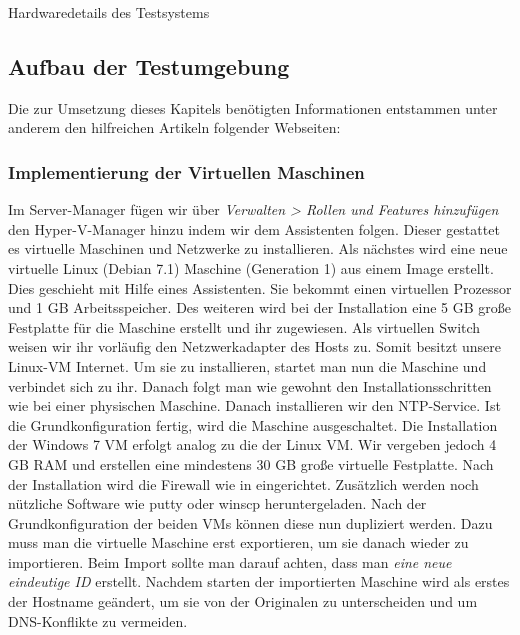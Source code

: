 \begin{table}
    \caption{Hardwaredetails des Testsystems}
    \label{tab:tabletestsystem}
\end{table}

\subsection{Aufbau der Testumgebung}
\label{app:testaufbau}
Die zur Umsetzung dieses Kapitels benötigten Informationen entstammen unter anderem den hilfreichen Artikeln folgender Webseiten: \cite{networkdriverhacking}

\subsubsection{Implementierung der Virtuellen Maschinen}
Im Server-Manager fügen wir über \textit{Verwalten > Rollen und Features hinzufügen} den Hyper-V-Manager hinzu indem wir dem Assistenten folgen. Dieser gestattet es virtuelle Maschinen und Netzwerke zu installieren.
Als nächstes wird eine neue virtuelle Linux (Debian 7.1)  Maschine (Generation 1) aus einem Image erstellt. Dies geschieht mit Hilfe eines Assistenten. Sie bekommt einen virtuellen Prozessor und 1 \ac{GB} Arbeitsspeicher. Des weiteren wird bei der Installation eine 5 \ac{GB} große Festplatte für die Maschine erstellt und ihr zugewiesen. Als virtuellen Switch weisen wir ihr vorläufig den Netzwerkadapter des Hosts zu. Somit besitzt unsere Linux-\ac{VM} Internet. Um sie zu installieren, startet man nun die Maschine und verbindet sich zu ihr. Danach folgt man wie gewohnt den Installationsschritten wie bei einer physischen Maschine. Danach installieren wir den \ac{NTP}-Service. Ist die Grundkonfiguration fertig, wird die Maschine ausgeschaltet.
Die Installation der Windows 7 \ac{VM} erfolgt analog zu die der Linux \ac{VM}. Wir vergeben jedoch 4 \ac{GB} \ac{RAM} und erstellen eine mindestens 30 \ac{GB} große virtuelle Festplatte. Nach der Installation wird die Firewall wie in  eingerichtet. Zusätzlich werden noch nützliche Software wie putty oder winscp heruntergeladen.
Nach der Grundkonfiguration der beiden \ac{VM}s können diese nun dupliziert werden. Dazu muss man die virtuelle Maschine erst exportieren, um sie danach wieder zu importieren. Beim Import sollte man darauf achten, dass man \textit{eine neue eindeutige \ac{ID} } erstellt. Nachdem starten der importierten Maschine wird als erstes der Hostname geändert, um sie von der Originalen zu unterscheiden und um \ac{DNS}-Konflikte zu vermeiden.

